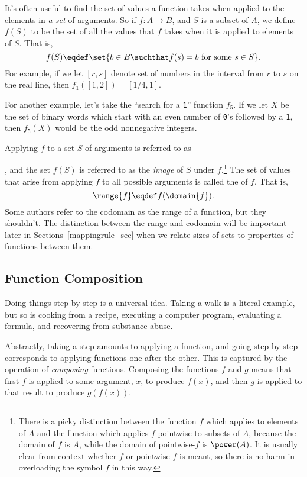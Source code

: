 It's often useful to find the set of values a function takes when applied
to the elements in \emph{a set} of arguments.  So if $f:A \to B$, and $S$
is a subset of $A$, we define $f(S)$ to be the set of all the values that
$f$ takes when it is applied to elements of $S$.  That is,
\[
f(S) \eqdef \set{b \in B \suchthat f(s) = b \text{ for some } s
  \in S}.
\]
For example, if we let $[r,s]$ denote set of numbers in the
interval from $r$ to $s$ on the real line, then $f_1([1,2]) =
[1/4,1]$.

For another example, let's take the ``search for a \texttt{1}''
function $f_5$.  If we let $X$ be the set of binary words which
start with an even number of \texttt{0}'s followed by a
\texttt{1}, then $f_5(X)$ would be the odd nonnegative integers.

Applying $f$ to a set $S$ of arguments is referred to as
, and the
set $f(S)$ is referred to as the \emph{image}%
of $S$ under $f$.\footnote{There is a picky distinction between the function $f$ which
  applies to elements of $A$ and the function which applies $f$ pointwise
  to subsets of $A$, because the domain of $f$ is $A$, while the domain of
  pointwise-$f$ is $\power(A)$.  It is usually clear from context whether
  $f$ or pointwise-$f$ is meant, so there is no harm in overloading the
  symbol $f$ in this way.}  The set of values that arise from applying $f$
to all possible arguments is called the  of $f$.  That is,
\[
\range{f} \eqdef f(\domain{f}).
\]
Some authors refer to the codomain as the range of a function, but
they shouldn't.  The distinction between the range and codomain will
be important later in Sections~\ref{mappingrule_sec} when we
relate sizes of sets to properties of functions between them.

\subsection{Function Composition}\label{func_compose_subsec}

Doing things step by step is a universal idea.  Taking a walk is a literal
example, but so is cooking from a recipe, executing a computer program,
evaluating a formula, and recovering from substance abuse.

Abstractly, taking a step amounts to applying a function, and going step
by step corresponds to applying functions one after the other.  This is
captured by the operation of \emph{composing}%
functions.  Composing the
functions $f$ and $g$ means that first $f$ is applied to some argument,
$x$, to produce $f(x)$, and then $g$ is applied to that result to produce
$g(f(x))$.

